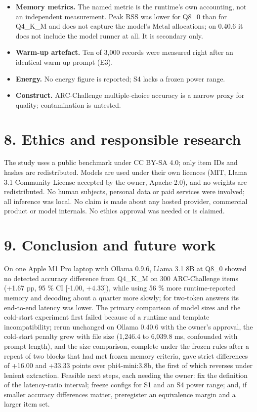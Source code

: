 \documentclass[
]{article}
\begin{document}
\begin{itemize}
  \textbf{Latency is prefill-dominated and descriptive.} The frozen
  latency-ratio interval is not implemented; the exploratory intervals
  cover within-session item variation only. Prefill rates depend on
  prompt length (E4).
\item
  \textbf{Memory metrics.} The named metric is the runtime's own
  accounting, not an independent measurement. Peak RSS was lower for
  Q8\_0 than for Q4\_K\_M and does not capture the model's Metal
  allocations; on 0.40.6 it does not include the model runner at all. It
  is secondary only.
\item
  \textbf{Warm-up artefact.} Ten of 3,000 records were measured right
  after an identical warm-up prompt (E3).
\item
  \textbf{Energy.} No energy figure is reported; S4 lacks a frozen power
  range.
\item
  \textbf{Construct.} ARC-Challenge multiple-choice accuracy is a narrow
  proxy for quality; contamination is untested.
\end{itemize}

\section{8. Ethics and responsible
research}\label{ethics-and-responsible-research}

The study uses a public benchmark under CC BY-SA 4.0; only item IDs and
hashes are redistributed. Models are used under their own licences (MIT,
Llama 3.1 Community License accepted by the owner, Apache-2.0), and no
weights are redistributed. No human subjects, personal data or paid
services were involved; all inference was local. No claim is made about
any hosted provider, commercial product or model internals. No ethics
approval was needed or is claimed.

\section{9. Conclusion and future
work}\label{conclusion-and-future-work}

On one Apple M1 Pro laptop with Ollama 0.9.6, Llama 3.1 8B at Q8\_0
showed no detected accuracy difference from Q4\_K\_M on 300
ARC-Challenge items (+1.67 pp, 95 \% CI {[}-1.00, +4.33{]}), while using
56 \% more runtime-reported memory and decoding about a quarter more
slowly; for two-token answers its end-to-end latency was lower. The
primary comparison of model sizes and the cold-start experiment first
failed because of a runtime and template incompatibility; rerun
unchanged on Ollama 0.40.6 with the owner's approval, the cold-start
penalty grew with file size (1,246.4 to 6,039.8 ms, confounded with
prompt length), and the size comparison, complete under the frozen rules
after a repeat of two blocks that had met frozen memory criteria, gave
strict differences of +16.00 and +33.33 points over phi4-mini:3.8b, the
first of which reverses under lenient extraction. Feasible next steps,
each needing the owner: fix the definition of the latency-ratio
interval; freeze configs for S1 and an S4 power range; and, if smaller
accuracy differences matter, preregister an equivalence margin and a
larger item set.
\end{document}
